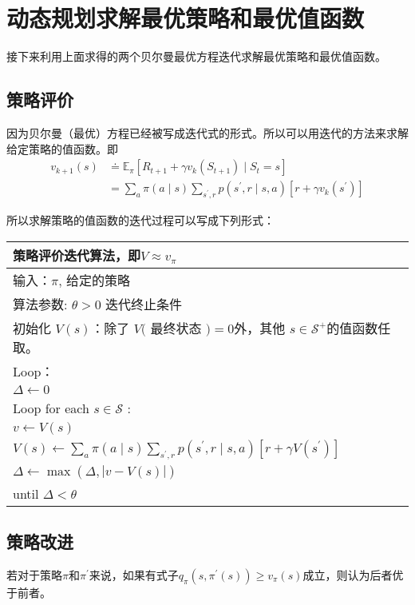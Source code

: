 \section{动态规划求解最优策略和最优值函数}
接下来利用上面求得的两个贝尔曼最优方程迭代求解最优策略和最优值函数\cite{sutton2018reinforcement}。
\subsection{策略评价}
因为贝尔曼（最优）方程已经被写成迭代式的形式。所以可以用迭代的方法来求解给定策略的值函数。即
$$
\begin{aligned}
v_{k+1}(s) & \doteq \mathbb{E}_{\pi}\left[R_{t+1}+\gamma v_{k}\left(S_{t+1}\right) \mid S_{t}=s\right] \\
&=\sum_{a} \pi(a \mid s) \sum_{s^{\prime}, r} p\left(s^{\prime}, r \mid s, a\right)\left[r+\gamma v_{k}\left(s^{\prime}\right)\right]
\end{aligned}
$$

所以求解策略的值函数的迭代过程可以写成下列形式：
\begin{table}[htbp]
  \centering
    \begin{tabular}{l}
	\bottomrule
	\bottomrule
	策略评价迭代算法，即$V \approx v_{\pi}$ \\
    \midrule
	输入：$\pi$, 给定的策略 \\
    算法参数:  $\theta>0$ 迭代终止条件 \\
    初始化 $V(s)$：除了 $V($ 最终状态 $)=0$外，其他 $s \in \mathcal{S}^{+}$的值函数任取。 \\
    Loop： \\
        \quad$\Delta \leftarrow 0$ \\
        \quad Loop for each $s \in \mathcal{S}$ : \\
            \quad \quad $v \leftarrow V(s)$  \\
            \quad \quad $V(s) \leftarrow \sum_{a} \pi(a \mid s) \sum_{s^{\prime}, r} p\left(s^{\prime}, r \mid s, a\right)\left[r+\gamma V\left(s^{\prime}\right)\right]$ \\
            \quad \quad $\Delta \leftarrow \max (\Delta,|v-V(s)|)$ \\
    until $\Delta < \theta$ \\
    \bottomrule
	\bottomrule
	\end{tabular}%
  \label{algorithm1}%
\end{table}%
\subsection{策略改进}
若对于策略$\pi$和$\pi^{\prime}$来说，如果有式子$q_{\pi}\left(s, \pi^{\prime}(s)\right) \geq v_{\pi}(s)$成立，则认为后者优于前者。

